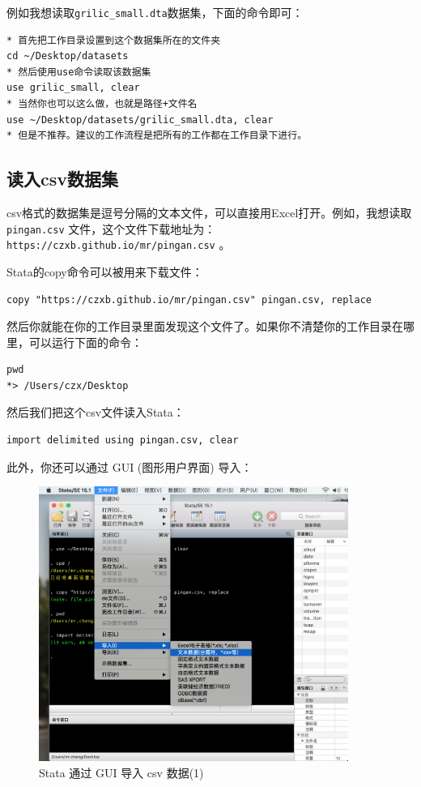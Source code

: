 例如我想读取\texttt{grilic\_small.dta}数据集，下面的命令即可：

\begin{lstlisting}
* 首先把工作目录设置到这个数据集所在的文件夹
cd ~/Desktop/datasets
* 然后使用use命令读取该数据集
use grilic_small, clear
* 当然你也可以这么做，也就是路径+文件名
use ~/Desktop/datasets/grilic_small.dta, clear
* 但是不推荐。建议的工作流程是把所有的工作都在工作目录下进行。
\end{lstlisting}

\subsection{读入csv数据集}
csv格式的数据集是逗号分隔的文本文件，可以直接用Excel打开。例如，我想读取 \texttt{pingan.csv} 文件，这个文件下载地址为：\texttt{https://czxb.github.io/mr/pingan.csv} 。

Stata的copy命令可以被用来下载文件：

\begin{lstlisting}
copy "https://czxb.github.io/mr/pingan.csv" pingan.csv, replace
\end{lstlisting}

然后你就能在你的工作目录里面发现这个文件了。如果你不清楚你的工作目录在哪里，可以运行下面的命令：

\begin{lstlisting}
pwd
*> /Users/czx/Desktop
\end{lstlisting}

然后我们把这个csv文件读入Stata：

\begin{lstlisting}
import delimited using pingan.csv, clear
\end{lstlisting}

此外，你还可以通过 GUI (图形用户界面) 导入：

\begin{figure}[htbp]
  \centering \includegraphics[width=0.9\textwidth]{assets/csvgui1.png}
  \caption{Stata 通过 GUI 导入 csv 数据(1)}
  \label{fig:csvgui1}
\end{figure}


